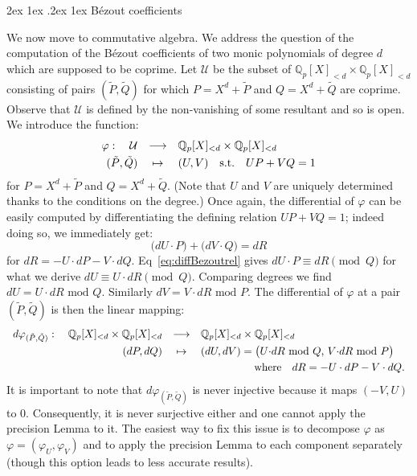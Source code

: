 \documentclass[11pt]{article}
\makeatletter
\numberwithin{equation}{section}
\numberwithin{figure}{section}
\renewcommand\paragraph{\@startsection{paragraph}{4}{\z@}%
                                    {2ex \@plus1ex \@minus.2ex}%
                                    {1ex}%
                                    {\normalfont\normalsize\bfseries}}
\theoremstyle{definition}
\newcommand{\Q}{\mathbb Q}
\newcommand{\Qp}{\Q_p}
\newcommand{\calU}{\mathcal U}
\makeatother
\begin{document}
\paragraph{Bézout coefficients}

We now move to commutative algebra. We address the question of the 
computation of the Bézout coefficients of two monic polynomials of 
degree $d$ which are supposed to be coprime.
Let $\mathcal U$ be the subset of $\Qp[X]_{< d} \times \Qp[X]_{< d}$ 
consisting of pairs $(\tilde P, \tilde Q)$ for which $P = X^d + \tilde 
P$ and $Q = X^d + \tilde Q$ are coprime. Observe that $\mathcal U$ is defined by
the non-vanishing of some resultant and so is open. We introduce the
function:
$$\begin{array}{rcl}
\varphi : \quad \calU & \longrightarrow & \Qp[X]_{< d} \times \Qp[X]_{< d} \smallskip \\
(\tilde P, \tilde Q) & \mapsto & (U,V) \quad \text{s.t.} \quad UP + VQ = 1
\end{array}$$
for $P = X^d + \tilde P$ and $Q = X^d + \tilde Q$. (Note that $U$
and $V$ are uniquely determined thanks to the conditions on the degree.)
Once again, the differential of $\varphi$ can be easily computed
by differentiating the defining relation $UP + VQ = 1$; indeed doing so,
we immediately get:
\begin{equation}
\label{eq:diffBezoutrel}
\big(dU \cdot P\big) + \big(dV \cdot Q\big) = dR
\end{equation}
for $dR = - U {\cdot} dP - V {\cdot} dQ$. Eq~\eqref{eq:diffBezoutrel} gives
$dU {\cdot} P \equiv dR \pmod Q$ for what we derive $dU \equiv U {\cdot} dR
\pmod Q$. Comparing degrees we find $dU = U {\cdot} dR \text{ mod } Q$.
Similarly $dV = V {\cdot} dR \text{ mod } P$. 
The differential of $\varphi$ at a pair $(\tilde P, \tilde Q)$ is 
then the linear mapping:
$$\begin{array}{rcl}
d \varphi_{(\tilde P, \tilde Q)} :
\quad \Qp[X]_{< d} \times \Qp[X]_{< d} & \longrightarrow & \Qp[X]_{< d} \times \Qp[X]_{< d} \smallskip \\
(dP, dQ) & \mapsto & (dU, dV) = \big(U{\cdot}dR \text{ mod } Q, \, V{\cdot}dR \text{ mod } P\big) \smallskip \\
& & \hspace{5em}\text{where} \quad dR = - U \cdot dP - V \cdot dQ.
\end{array}$$
It is important to note that $d \varphi_{(\tilde P, \tilde Q)}$ is never
injective because it maps $(-V, U)$ to $0$. Consequently, it is never
surjective either and one cannot apply the precision Lemma to it. The
easiest way to fix this issue is to decompose $\varphi$ as $\varphi = 
(\varphi_U, \varphi_V)$ and to apply the precision Lemma to each 
component separately (though this option leads to less accurate results).
\end{document}
